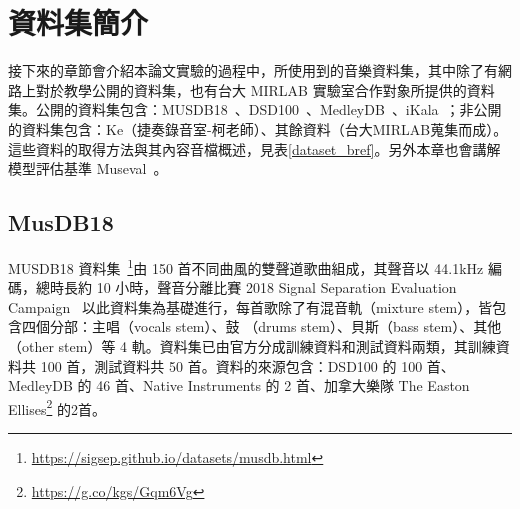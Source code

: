 \chapter{資料集簡介}
接下來的章節會介紹本論文實驗的過程中，所使用到的音樂資料集，其中除了有網路上對於教學公開的資料集，也有台大 MIRLAB 實驗室合作對象所提供的資料集。公開的資料集包含：MUSDB18~\cite{rafii2017musdb18,musdb18}、DSD100~\cite{SiSEC16}、MedleyDB~\cite{bittner2014medleydb}、iKala~\cite{chan2015vocal}；非公開的資料集包含：Ke（捷奏錄音室-柯老師）、其餘資料（台大MIRLAB蒐集而成）。這些資料的取得方法與其內容音檔概述，見表\ref{dataset_bref}。另外本章也會講解模型評估基準 Museval~\cite{stoter20182018}。

\begin{table}[h!]
\centering
{}
\caption{資料集概述}
\label{dataset_bref}
\end{table}

\section{MusDB18}
MUSDB18 資料集~\cite{rafii2017musdb18,musdb18}\footnote{\url{https://sigsep.github.io/datasets/musdb.html}}由 150 首不同曲風的雙聲道歌曲組成，其聲音以 44.1kHz 編碼，總時長約 10 小時，聲音分離比賽 2018 Signal Separation Evaluation Campaign~\cite{stoter20182018} 以此資料集為基礎進行，每首歌除了有混音軌（mixture stem），皆包含四個分部：主唱（vocals stem）、鼓 （drums stem）、貝斯（bass stem）、其他（other stem）等 4 軌。資料集已由官方分成訓練資料和測試資料兩類，其訓練資料共 100 首，測試資料共 50 首。資料的來源包含：DSD100 的 100 首、 MedleyDB 的 46 首、Native Instruments 的 2 首、加拿大樂隊 The Easton Ellises\footnote{\url{https://g.co/kgs/Gqm6Vg}} 的2首。

